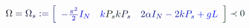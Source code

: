 \documentclass[12pt]{article}
\begin{document}
\makeatletter
\renewcommand*{\@textcolor}[3]{%
  \protect\leavevmode
  \begingroup
    \color#1{#2}#3%
  \endgroup
}
\makeatother
\begin{displaymath}
\mathcolor[RGB]{0,0,15}{\Omega} \mathcolor[RGB]{0,0,30}{=} \mathcolor[RGB]{0,0,45}{\Omega} _ { \mathcolor[RGB]{0,0,60}{s} } \mathcolor[RGB]{0,0,75}{:} \mathcolor[RGB]{0,0,90}{=} \mathcolor[RGB]{0,0,105}{\left[} \begin{array} {ccc} \mathcolor[RGB]{0,0,120}{\textstyle} { \mathcolor[RGB]{0,0,135}{-} \mathcolor[RGB]{0,0,150}{\frac { \mathcolor[RGB]{0,0,165}{\pi} ^ { \mathcolor[RGB]{0,0,180}{2} } } { \mathcolor[RGB]{0,0,195}{2} } } \mathcolor[RGB]{0,0,210}{I} _ { \mathcolor[RGB]{0,0,225}{N} } } & \mathcolor[RGB]{0,0,240}{\textstyle} { \mathcolor[RGB]{0,0,255}{k} \mathcolor[RGB]{0,15,0}{P} _ { \mathcolor[RGB]{0,15,15}{s} } \mathcolor[RGB]{0,15,30}{k} \mathcolor[RGB]{0,15,45}{P} _ { \mathcolor[RGB]{0,15,60}{s} } } & \mathcolor[RGB]{0,15,75}{\textstyle} { \mathcolor[RGB]{0,15,90}{2} \mathcolor[RGB]{0,15,105}{\alpha} \mathcolor[RGB]{0,15,120}{I} _ { \mathcolor[RGB]{0,15,135}{N} } \mathcolor[RGB]{0,15,150}{-} \mathcolor[RGB]{0,15,165}{2} \mathcolor[RGB]{0,15,180}{k} \mathcolor[RGB]{0,15,195}{P} _ { \mathcolor[RGB]{0,15,210}{s} } \mathcolor[RGB]{0,15,225}{+} \mathcolor[RGB]{0,15,240}{g} \mathcolor[RGB]{0,15,255}{L} } \end{array} \mathcolor[RGB]{0,30,0}{\right]} \mathcolor[RGB]{0,30,15}{\prec} \mathcolor[RGB]{0,30,30}{0}
\end{displaymath}
\end{document}
